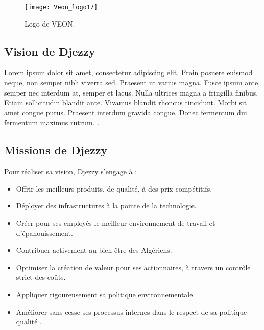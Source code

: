 \begin{figure}[hbt!]
  \centering
  \texttt{[image: Veon\_logo17]}
  \caption{Logo de VEON.}
  \label{fig:logo-veon}
\end{figure}
\FloatBarrier

\medskip

\subsection{Vision de Djezzy}
Lorem ipsum dolor sit amet, consectetur adipiscing elit. Proin posuere euismod neque, non semper nibh viverra sed. Praesent ut varius magna. Fusce ipsum ante, semper nec interdum at, semper et lacus. Nulla ultrices magna a fringilla finibus. Etiam sollicitudin blandit ante. Vivamus blandit rhoncus tincidunt. Morbi sit amet congue purus. Praesent interdum gravida congue. Donec fermentum dui fermentum maximus rutrum. \parencite{djezzy_vision_2019}.

\medskip

\subsection{Missions de Djezzy}
Pour réaliser sa vision, Djezzy s'engage à :
\begin{itemize}
  \item  Offrir les meilleurs produits, de qualité, à des prix compétitifs.
  \item  Déployer des infrastructures à la pointe de la technologie.
  \item  Créer pour ses employés le meilleur environnement de travail et d’épanouissement.
  \item Contribuer activement au bien-être des Algériens.
  \item Optimiser la création de valeur pour ses actionnaires, à travers un contrôle strict des coûts.
  \item Appliquer rigoureusement sa politique environnementale.
  \item Améliorer sans cesse ses processus internes dans le respect de sa politique qualité \parencite{djezzy_vision_2019}.
\end{itemize}

\medskip

